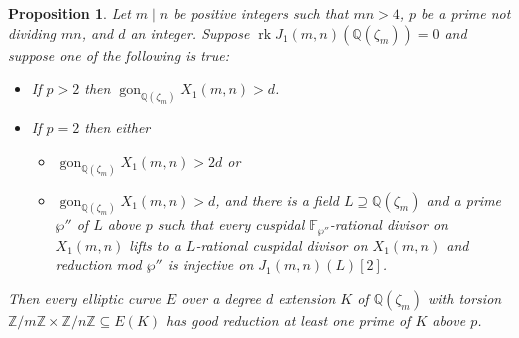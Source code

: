 \documentclass[11pt,reqno]{amsart}
\DeclareMathOperator{\rk}{rk}
\DeclareMathOperator{\gon}{gon}
\newtheorem{proposition}[theorem]{Proposition}
\theoremstyle{definition}
\numberwithin{equation}{section}
\newcommand{\Q}{\mathbb{Q}}
\newcommand{\F}{\mathbb{F}}
\def\tg#1#2{\mathbb Z/#1\mathbb Z \times \mathbb Z /#2 \mathbb Z}
\newcommand{\maarten}[1]{{\color{blue} \sf $\clubsuit\clubsuit\clubsuit$ Maarten: [#1]}}
\begin{document}
\begin{proposition}\label{prop_main}
  Let $m\mid n$ be positive integers such that $mn>4$, $p$ be a prime not dividing $mn$, and $d$ an integer. Suppose $\rk J_1(m,n)(\Q(\zeta_m))=0$ and suppose one of the following is true:
  
\begin{itemize}
    \item[a)] If $p>2$ then $\gon_{\Q(\zeta_m)} X_1(m,n)>d$.

    \item[b)] If $p=2$ then either \begin{itemize}
        \item[i)]  $\gon_{\Q(\zeta_m)} X_1(m,n)>2d$ or
        \item [ii)] $\gon_{\Q(\zeta_m)} X_1(m,n)>d$, and there is a field $L \supseteq \Q(\zeta_m)$ and a prime $\wp''$ of $L$ above $p$ such that every cuspidal $\F_{\wp''}$-rational divisor on $X_1(m,n)$ lifts to a $L$-rational cuspidal divisor on $X_1(m,n)$ and reduction mod $\wp''$ is injective on $J_1(m,n)(L)[2]$. %
    \end{itemize}
\end{itemize}  
  Then every elliptic curve $E$ over a degree $d$ extension $K$ of $\Q(\zeta_m)$ with torsion $\tg{m}{n}\subseteq E(K)$ has good reduction at least one prime of $K$ above $p$.
  
  
  

\end{proposition}
\end{document}
